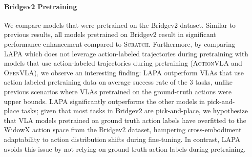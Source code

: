 \documentclass{article} %
\begin{document}
\paragraph{Bridgev2 Pretraining} We compare models that were pretrained on the Bridgev2 dataset. 
Similar to previous results, all models pretrained on Bridgev2 result in significant performance enhancement compared to \textsc{Scratch}. Furthermore, by comparing LAPA which does not leverage action-labeled trajectories during pretraining with models that use action-labeled trajectories during pretraining (\textsc{ActionVLA} and \textsc{OpenVLA}), we observe an interesting finding: LAPA outperform VLAs that use action labeled pretraining data on average success rate of the 3 tasks, unlike previous scenarios where VLAs pretrained on the ground-truth actions were upper bounds. LAPA significantly outperforms the other models in pick-and-place tasks; given that most tasks in Bridgev2 are pick-and-place, we hypothesize that VLA models pretrained on ground truth action labels have overfitted to the WidowX action space from the Bridgev2 dataset, hampering cross-embodiment adaptability to action distribution shifts during fine-tuning. In contrast, LAPA avoids this issue by not relying on ground truth action labels during pretraining.


\begin{table}[t!]
\centering
\caption{\textbf{Evaluation Results divided into eval types}. We average the success rate across the 3 tasks depending on what capability we are trying to quantify: (1) seen objects but unseen combinations, (2) unseen objects, and new instructions requiring semantic reasoning. Best is \textbf{bolded} and second best is \underline{underlined}.}
\label{tab:real_robot}
\vspace{-5mm}
\end{table}
\end{document}
